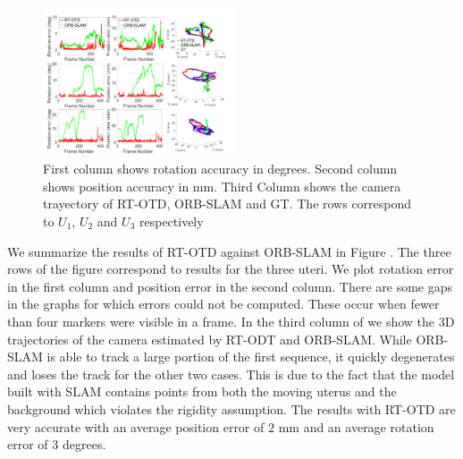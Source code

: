 \begin{figure}[htbp]
  \centering
  \includegraphics[width=0.51\textwidth]{./figs/Accuracy_errors.pdf}
\caption{First column shows rotation accuracy in degrees. Second column shows position accuracy in mm. Third Column shows the camera trayectory of RT-OTD, ORB-SLAM and GT. The rows correspond to $U_1$, $U_2$ and $U_3$ respectively}
\label{fig:hister_results}
\end{figure}
We summarize the results of RT-OTD against ORB-SLAM in Figure .
The three rows of the figure correspond to results for the three uteri. We plot rotation error in the first column and position error in the second column. There are some gaps in the
graphs for which errors could not be computed. These occur when fewer than four markers were visible in a frame. In the third column of  we show the 3D trajectories of the camera estimated by RT-ODT and ORB-SLAM. While ORB-SLAM is able to track a large portion of the first sequence, it quickly degenerates and loses the track for the other two cases. This is due to the fact that the model built with SLAM contains points from both the moving uterus and the background which violates the rigidity assumption. The results with RT-OTD are very accurate with an average position error of $2$ mm and an average rotation error of $3$ degrees.   

